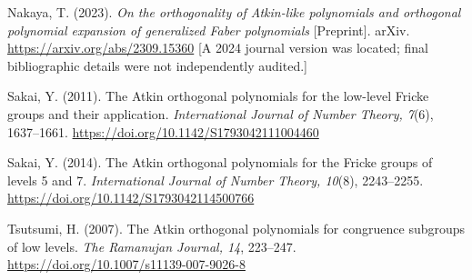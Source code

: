 \documentclass[11pt,a4paper]{article}
\begin{document}
\begin{description}
\item Nakaya, T. (2023). \emph{On the orthogonality of Atkin-like polynomials and orthogonal polynomial expansion of generalized Faber polynomials} [Preprint]. arXiv. \url{https://arxiv.org/abs/2309.15360} [A 2024 journal version was located; final bibliographic details were not independently audited.]
\item Sakai, Y. (2011). The Atkin orthogonal polynomials for the low-level Fricke groups and their application. \emph{International Journal of Number Theory, 7}(6), 1637--1661. \url{https://doi.org/10.1142/S1793042111004460}
\item Sakai, Y. (2014). The Atkin orthogonal polynomials for the Fricke groups of levels 5 and 7. \emph{International Journal of Number Theory, 10}(8), 2243--2255. \url{https://doi.org/10.1142/S1793042114500766}
\item Tsutsumi, H. (2007). The Atkin orthogonal polynomials for congruence subgroups of low levels. \emph{The Ramanujan Journal, 14}, 223--247. \url{https://doi.org/10.1007/s11139-007-9026-8}
\end{description}
\end{document}
